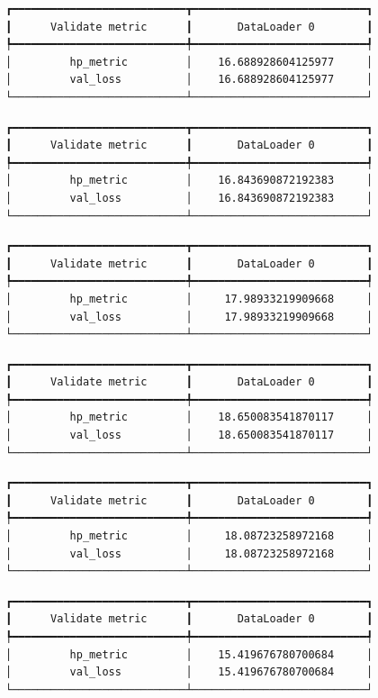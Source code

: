 \documentclass[
  letterpaper,
  DIV=11,
  numbers=noendperiod]{scrreprt}
\begin{document}
\begin{verbatim}
┏━━━━━━━━━━━━━━━━━━━━━━━━━━━┳━━━━━━━━━━━━━━━━━━━━━━━━━━━┓
┃      Validate metric      ┃       DataLoader 0        ┃
┡━━━━━━━━━━━━━━━━━━━━━━━━━━━╇━━━━━━━━━━━━━━━━━━━━━━━━━━━┩
│         hp_metric         │    16.688928604125977     │
│         val_loss          │    16.688928604125977     │
└───────────────────────────┴───────────────────────────┘
\end{verbatim}

\begin{verbatim}
┏━━━━━━━━━━━━━━━━━━━━━━━━━━━┳━━━━━━━━━━━━━━━━━━━━━━━━━━━┓
┃      Validate metric      ┃       DataLoader 0        ┃
┡━━━━━━━━━━━━━━━━━━━━━━━━━━━╇━━━━━━━━━━━━━━━━━━━━━━━━━━━┩
│         hp_metric         │    16.843690872192383     │
│         val_loss          │    16.843690872192383     │
└───────────────────────────┴───────────────────────────┘
\end{verbatim}

\begin{verbatim}
┏━━━━━━━━━━━━━━━━━━━━━━━━━━━┳━━━━━━━━━━━━━━━━━━━━━━━━━━━┓
┃      Validate metric      ┃       DataLoader 0        ┃
┡━━━━━━━━━━━━━━━━━━━━━━━━━━━╇━━━━━━━━━━━━━━━━━━━━━━━━━━━┩
│         hp_metric         │     17.98933219909668     │
│         val_loss          │     17.98933219909668     │
└───────────────────────────┴───────────────────────────┘
\end{verbatim}

\begin{verbatim}
┏━━━━━━━━━━━━━━━━━━━━━━━━━━━┳━━━━━━━━━━━━━━━━━━━━━━━━━━━┓
┃      Validate metric      ┃       DataLoader 0        ┃
┡━━━━━━━━━━━━━━━━━━━━━━━━━━━╇━━━━━━━━━━━━━━━━━━━━━━━━━━━┩
│         hp_metric         │    18.650083541870117     │
│         val_loss          │    18.650083541870117     │
└───────────────────────────┴───────────────────────────┘
\end{verbatim}

\begin{verbatim}
┏━━━━━━━━━━━━━━━━━━━━━━━━━━━┳━━━━━━━━━━━━━━━━━━━━━━━━━━━┓
┃      Validate metric      ┃       DataLoader 0        ┃
┡━━━━━━━━━━━━━━━━━━━━━━━━━━━╇━━━━━━━━━━━━━━━━━━━━━━━━━━━┩
│         hp_metric         │     18.08723258972168     │
│         val_loss          │     18.08723258972168     │
└───────────────────────────┴───────────────────────────┘
\end{verbatim}

\begin{verbatim}
┏━━━━━━━━━━━━━━━━━━━━━━━━━━━┳━━━━━━━━━━━━━━━━━━━━━━━━━━━┓
┃      Validate metric      ┃       DataLoader 0        ┃
┡━━━━━━━━━━━━━━━━━━━━━━━━━━━╇━━━━━━━━━━━━━━━━━━━━━━━━━━━┩
│         hp_metric         │    15.419676780700684     │
│         val_loss          │    15.419676780700684     │
└───────────────────────────┴───────────────────────────┘
\end{verbatim}
\end{document}
